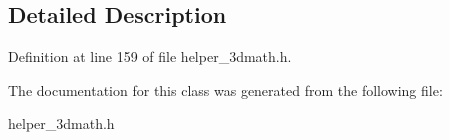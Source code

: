 \subsection{Detailed Description}


Definition at line 159 of file helper\+\_\+3dmath.\+h.



The documentation for this class was generated from the following file\+:\begin{DoxyCompactItemize}
\item 
helper\+\_\+3dmath.\+h\end{DoxyCompactItemize}
